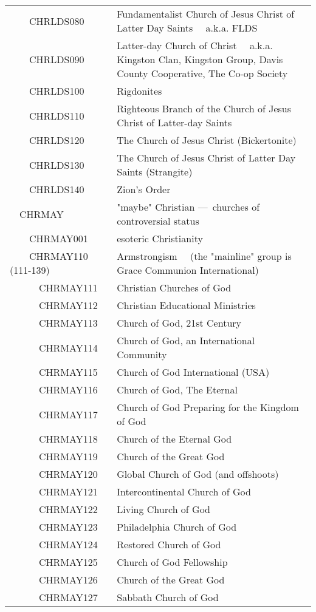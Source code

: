 \documentclass[12pt]{article}
\begin{document}
\begin{tiny}
\begin{center}
\begin{longtable}{|l|l|}
~~~~CHRLDS080 & Fundamentalist Church of Jesus Christ of Latter Day Saints	~~a.k.a. FLDS \\
~~~~CHRLDS090 & Latter-day Church of Christ	~~a.k.a. Kingston Clan, Kingston Group, Davis County Cooperative, The Co-op Society \\
~~~~CHRLDS100 & Rigdonites \\
~~~~CHRLDS110 & Righteous Branch of the Church of Jesus Christ of Latter-day Saints \\
~~~~CHRLDS120 & The Church of Jesus Christ (Bickertonite) \\
~~~~CHRLDS130 & The Church of Jesus Christ of Latter Day Saints (Strangite) \\
~~~~CHRLDS140 & Zion's Order \\
~~CHRMAY & "maybe" Christian — churches of controversial status \\
~~~~CHRMAY001 & esoteric Christianity \\
~~~~CHRMAY110 (111-139) & Armstrongism	~~(the "mainline" group is Grace Communion International) \\
~~~~~~CHRMAY111 & Christian Churches of God \\
~~~~~~CHRMAY112 & Christian Educational Ministries \\
~~~~~~CHRMAY113 & Church of God, 21st Century \\
~~~~~~CHRMAY114 & Church of God, an International Community \\
~~~~~~CHRMAY115 & Church of God International (USA) \\
~~~~~~CHRMAY116 & Church of God, The Eternal \\
~~~~~~CHRMAY117 & Church of God Preparing for the Kingdom of God \\
~~~~~~CHRMAY118 & Church of the Eternal God \\
~~~~~~CHRMAY119 & Church of the Great God \\
~~~~~~CHRMAY120 & Global Church of God (and offshoots) \\
~~~~~~CHRMAY121 & Intercontinental Church of God \\
~~~~~~CHRMAY122 & Living Church of God \\
~~~~~~CHRMAY123 & Philadelphia Church of God \\
~~~~~~CHRMAY124 & Restored Church of God \\
~~~~~~CHRMAY125 & Church of God Fellowship \\
~~~~~~CHRMAY126 & Church of the Great God \\
~~~~~~CHRMAY127 & Sabbath Church of God \\

\end{longtable}
\end{center}
\end{tiny}
\end{document}
